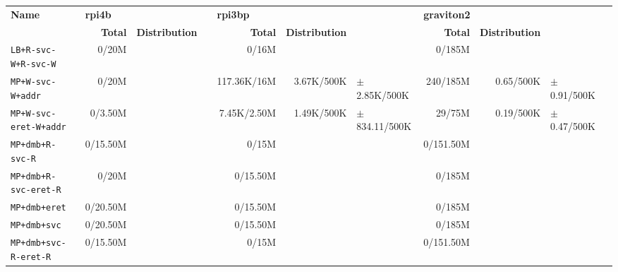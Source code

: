 \begin{tabular}{l  | r r l | r r l | r r l l}
   \textbf{Name}                  & \multicolumn{3}{l}{\textbf{rpi4b}}                       & \multicolumn{3}{l}{\textbf{rpi3bp}}                         & \multicolumn{3}{l}{\textbf{graviton2}}                        & \\
                                  & \textbf{Total} & \textbf{Distribution} &                 & \textbf{Total} & \textbf{Distribution} &                   & \textbf{Total} & \textbf{Distribution} &                  & \\
        \verb|LB+R-svc-W+R-svc-W| &          0/20M &                       &                 &          0/16M &                       &                   &         0/185M &                       &                  & \\ \hline 
           \verb|MP+W-svc-W+addr| &          0/20M &                       &                 &    117.36K/16M &            3.67K/500K &  $\pm$ 2.85K/500K &       240/185M &             0.65/500K &  $\pm$ 0.91/500K & \\ \hline 
      \verb|MP+W-svc-eret-W+addr| &        0/3.50M &                       &                 &    7.45K/2.50M &            1.49K/500K & $\pm$ 834.11/500K &         29/75M &             0.19/500K &  $\pm$ 0.47/500K & \\ \hline 
            \verb|MP+dmb+R-svc-R| &       0/15.50M &                       &                 &          0/15M &                       &                   &      0/151.50M &                       &                  & \\ \hline 
       \verb|MP+dmb+R-svc-eret-R| &          0/20M &                       &                 &       0/15.50M &                       &                   &         0/185M &                       &                  & \\ \hline 
               \verb|MP+dmb+eret| &       0/20.50M &                       &                 &       0/15.50M &                       &                   &         0/185M &                       &                  & \\ \hline 
                \verb|MP+dmb+svc| &       0/20.50M &                       &                 &       0/15.50M &                       &                   &         0/185M &                       &                  & \\ \hline 
       \verb|MP+dmb+svc-R-eret-R| &       0/15.50M &                       &                 &          0/15M &                       &                   &      0/151.50M &                       &                  & \\ \hline 

\end{tabular}
